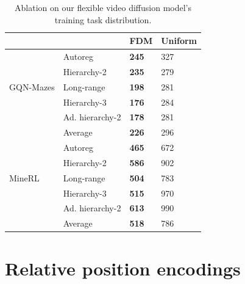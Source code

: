 \begin{table}[t]
    \centering
    \small
    \caption{Ablation on our flexible video diffusion model's training task distribution.}
    \label{tab:fdm-task-dist-ablation}
    \begin{tabular}{l|l|ll}
    \toprule
        ~ & ~ & FDM & Uniform \\%
        \midrule
        \multirow{5}{*}{GQN-Mazes} & Autoreg & \textbf{245} & 327 \\%
        ~ & Hierarchy-2 & \textbf{235} & 279 \\%
        ~ & Long-range & \textbf{198} & 281 \\%
        ~ & Hierarchy-3 & \textbf{176} & 284 \\%
        ~ & Ad. hierarchy-2 & \textbf{178} & 281 \\%
        ~ & Average & \textbf{226} & 296 \\%
        \midrule
        ~ & Autoreg & \textbf{465} & 672 \\%
        ~ & Hierarchy-2 & \textbf{586} & 902 \\%
        MineRL & Long-range & \textbf{504} & 783 \\%
        ~ & Hierarchy-3 & \textbf{515} & 970 \\%
        ~ & Ad. hierarchy-2 & \textbf{613} & 990 \\%
        ~ & Average & \textbf{518} & 786 \\%
        \bottomrule
    \end{tabular}
\end{table}


\section{Relative position encodings} \label{app:fdm-rpe}



